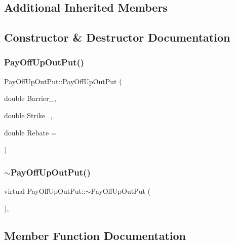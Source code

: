 \subsection*{Additional Inherited Members}


\subsection{Constructor \& Destructor Documentation}
\hypertarget{classPayOffUpOutPut_afcae251ac745e542c6110f19590bca14}{}\label{classPayOffUpOutPut_afcae251ac745e542c6110f19590bca14} 
\subsubsection{\texorpdfstring{Pay\+Off\+Up\+Out\+Put()}{PayOffUpOutPut()}}
{\footnotesize\ttfamily Pay\+Off\+Up\+Out\+Put\+::\+Pay\+Off\+Up\+Out\+Put (\begin{DoxyParamCaption}\item[{double}]{Barrier\+\_\+,  }\item[{double}]{Strike\+\_\+,  }\item[{double}]{Rebate = {} }\end{DoxyParamCaption})}

\hypertarget{classPayOffUpOutPut_ae7f29443c823d656a24f3272a75ea0f1}{}\label{classPayOffUpOutPut_ae7f29443c823d656a24f3272a75ea0f1} 
\subsubsection{\texorpdfstring{$\sim$\+Pay\+Off\+Up\+Out\+Put()}{~PayOffUpOutPut()}}
{\footnotesize\ttfamily virtual Pay\+Off\+Up\+Out\+Put\+::$\sim$\+Pay\+Off\+Up\+Out\+Put (\begin{DoxyParamCaption}{ }\end{DoxyParamCaption})\hspace{0.3cm}{\ttfamily [inline]}, {\ttfamily [virtual]}}



\subsection{Member Function Documentation}
\hypertarget{classPayOffUpOutPut_ac754f661e8dbe25f447baddc8b2d302f}{}\label{classPayOffUpOutPut_ac754f661e8dbe25f447baddc8b2d302f} 
